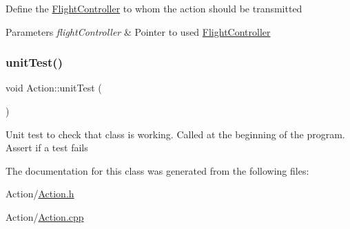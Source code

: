 Define the \mbox{\hyperlink{class_m210_1_1_flight_controller}{Flight\+Controller}} to whom the action should be transmitted 
\begin{DoxyParams}{Parameters}
{\em flight\+Controller} & Pointer to used \mbox{\hyperlink{class_m210_1_1_flight_controller}{Flight\+Controller}} \\
\hline
\end{DoxyParams}
\mbox{\label{class_m210_1_1_action_ac60580623e0519acbada490342fc8f0b}} 
\subsubsection{\texorpdfstring{unit\+Test()}{unitTest()}}
{\footnotesize\ttfamily void Action\+::unit\+Test (\begin{DoxyParamCaption}{ }\end{DoxyParamCaption})\hspace{0.3cm}{\ttfamily [static]}}

Unit test to check that class is working. Called at the beginning of the program. Assert if a test fails 

The documentation for this class was generated from the following files\+:\begin{DoxyCompactItemize}
\item 
Action/\mbox{\hyperlink{_action_8h}{Action.\+h}}\item 
Action/\mbox{\hyperlink{_action_8cpp}{Action.\+cpp}}\end{DoxyCompactItemize}

